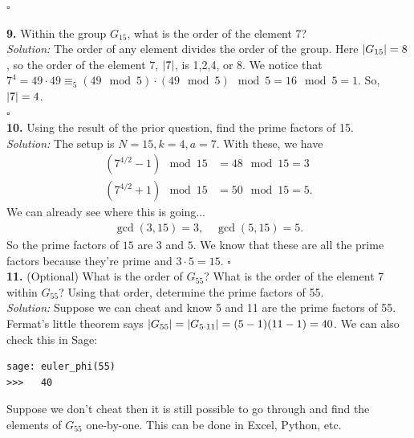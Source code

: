 \documentclass{book}
\theoremstyle{definition}
\newcommand{\lp}{\left(}
\newcommand{\rp}{\right)}
\begin{document}
\hfill $\square$





\noindent \textbf{9.} Within the group $G_{15}$, what is the order of the element 7?\\


\noindent \textit{Solution:} The order of any element divides the order of the group. Here $\abs{G_{15}} = 8$, so the order of the element $7$, $\abs{7}$, is 1,2,4, or 8. We notice that $7^4 = 49\cdot 49 \equiv_5 (49\mod 5) \cdot (49 \mod 5) \mod 5 = 16\mod 5 = 1$. So, $\abs{7} = 4$. \\ 

\hfill $\square$\\




\noindent \textbf{10.} Using the result of the prior question, find the prime factors of 15.\\


\noindent \textit{Solution:} The setup is $N=15, k = 4, a= 7$. With these, we have
\begin{align}
\lp 7^{4/2} - 1 \rp \mod 15 &= 48\mod 15 = 3\\
\lp 7^{4/2} + 1 \rp \mod 15 &= 50\mod 15 = 5.
\end{align}
We can already see where this is going...
\begin{align}
\gcd(3,15)= 3, \quad \gcd(5,15) = 5.
\end{align}
So the prime factors of $15$ are $3$ and $5$. We know that these are all the prime factors because they're prime and $3\cdot 5 = 15$. \hfill $\square$\\



\noindent \textbf{11.} (Optional) What is the order of $G_{55}$? What is the order of the element 7 within $G_{55}$? Using that order, determine the prime factors of 55.\\


\noindent \textit{Solution:} Suppose we can cheat and know 5 and 11 are the prime factors of 55. Fermat's little theorem says $\abs{G_{55}} = \abs{G_{5\cdot 11}} = (5-1)(11-1) = 40$. We can also check this in Sage:
\begin{lstlisting}
sage: euler_phi(55)
>>>   40
\end{lstlisting}

Suppose we don't cheat then it is still possible to go through and find the elements of $G_{55}$ one-by-one. This can be done in Excel, Python, etc. \\
\end{document}
